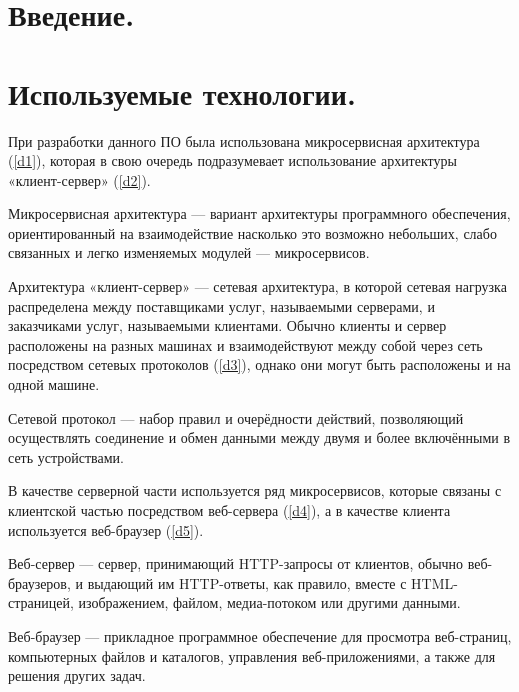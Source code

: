 \section{Введение.}

\clearpage

\section{Используемые технологии.}

При разработки данного ПО была использована микросервисная архитектура (\ref{d1}), которая в свою очередь
подразумевает использование архитектуры «клиент-сервер» (\ref{d2}).
\begin{definition}
    \label{d1}
    Микросервисная архитектура — вариант архитектуры программного обеспечения,
    ориентированный на взаимодействие насколько это возможно небольших, слабо связанных и легко изменяемых
    модулей — микросервисов.
\end{definition}
\begin{definition}
    \label{d2}
    Архитектура «клиент-сервер» — сетевая архитектура, в которой сетевая нагрузка распределена между поставщиками услуг,
    называемыми серверами, и заказчиками услуг, называемыми клиентами. Обычно клиенты и сервер расположены на разных
    машинах и взаимодействуют между собой через сеть посредством сетевых протоколов (\ref{d3}), однако они могут быть расположены
    и на одной машине.
\end{definition}
\begin{definition}
    \label{d3}
    Сетевой протокол — набор правил и очерёдности действий, позволяющий осуществлять соединение и
    обмен данными между двумя и более включёнными в сеть устройствами.
\end{definition}
В качестве серверной части используется ряд микросервисов, которые связаны с клиентской частью посредством
веб-сервера (\ref{d4}), а в качестве клиента используется веб-браузер (\ref{d5}).
\begin{definition}
    \label{d4}
    Веб-сервер — сервер, принимающий HTTP-запросы от клиентов, обычно веб-браузеров, и выдающий им HTTP-ответы,
    как правило, вместе с HTML-страницей, изображением, файлом, медиа-потоком или другими данными.
\end{definition}
\begin{definition}
    \label{d5}
    Веб-браузер — прикладное программное обеспечение для просмотра веб-страниц, компьютерных файлов и каталогов,
    управления веб-приложениями, а также для решения других задач.
\end{definition}
